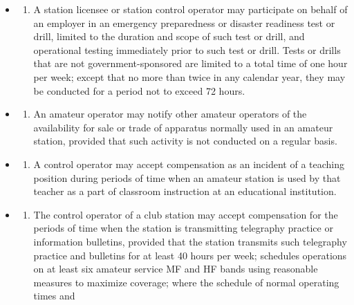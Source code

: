 \documentclass[
  letterpaper,
  DIV=11,
  numbers=noendperiod]{scrreport}
\providecommand{\tightlist}{%
  \setlength{\itemsep}{0pt}\setlength{\parskip}{0pt}}\usepackage{longtable,booktabs,array}
\begin{document}
\begin{itemize}
  \begin{itemize}
  \item
    \begin{enumerate}
    \def\labelenumi{(\roman{enumi})}
    \tightlist
    \item
      A station licensee or station control operator may participate on
      behalf of an employer in an emergency preparedness or disaster
      readiness test or drill, limited to the duration and scope of such
      test or drill, and operational testing immediately prior to such
      test or drill. Tests or drills that are not government-sponsored
      are limited to a total time of one hour per week; except that no
      more than twice in any calendar year, they may be conducted for a
      period not to exceed 72 hours.
    \end{enumerate}
  \item
    \begin{enumerate}
    \def\labelenumi{(\roman{enumi})}
    \setcounter{enumi}{1}
    \tightlist
    \item
      An amateur operator may notify other amateur operators of the
      availability for sale or trade of apparatus normally used in an
      amateur station, provided that such activity is not conducted on a
      regular basis.
    \end{enumerate}
  \item
    \begin{enumerate}
    \def\labelenumi{(\roman{enumi})}
    \setcounter{enumi}{2}
    \tightlist
    \item
      A control operator may accept compensation as an incident of a
      teaching position during periods of time when an amateur station
      is used by that teacher as a part of classroom instruction at an
      educational institution.
    \end{enumerate}
  \item
    \begin{enumerate}
    \def\labelenumi{(\roman{enumi})}
    \setcounter{enumi}{3}
    \tightlist
    \item
      The control operator of a club station may accept compensation for
      the periods of time when the station is transmitting telegraphy
      practice or information bulletins, provided that the station
      transmits such telegraphy practice and bulletins for at least 40
      hours per week; schedules operations on at least six amateur
      service MF and HF bands using reasonable measures to maximize
      coverage; where the schedule of normal operating times and

\end{enumerate}
\end{itemize}
\end{itemize}
\end{document}
